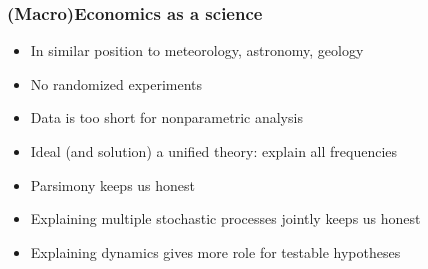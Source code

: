 \documentclass{beamer}
\begin{document}
\begin{frame}
\frametitle[alignment=center]{(Macro)Economics as a science}
\begin{itemize}
\item In similar position to meteorology, astronomy, geology
\bigskip
\item No randomized experiments
\bigskip
\item Data is too short for nonparametric analysis
\bigskip
\item Ideal (and solution) a unified theory: explain all frequencies
\bigskip
\item Parsimony keeps us honest
\bigskip
\item Explaining multiple stochastic processes jointly keeps us honest
\bigskip
\item Explaining dynamics gives more role for testable hypotheses
\end{itemize}
\end{frame}
\end{document}

